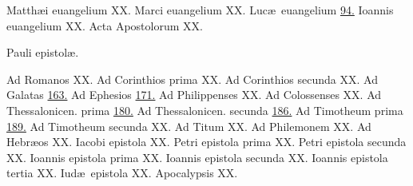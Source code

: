 \documentclass[a5paper,10pt]{book}
\def\ae{æ}
\begin{document}
\begin{multicols}{2}
\par \noindent Matth\ae i euangelium \hfill XX.
\newline Marci euangelium \hfill XX.
\newline Luc\ae \ euangelium \hfill \hyperlink{page.94}{94.}
\newline Ioannis euangelium \hfill XX.
\newline Acta Apostolorum \hfill XX.
\newline \vspace{-1.75em}
\begin{center}
\color{red} Pauli epistol\ae .
\end{center}
\vspace{-.75em}
\par\noindent Ad Romanos \hfill XX.
\newline Ad Corinthios prima \hfill XX.
\newline Ad Corinthios secunda \hfill XX.
\newline Ad Galatas \hfill \hyperlink{page.163}{163.}
\newline Ad Ephesios \hfill \hyperlink{page.171}{171.}
\newline Ad Philippenses \hfill XX.
\newline Ad Colossenses \hfill XX.
\newline Ad Thessalonicen. prima \hfill \hyperlink{page.180}{180.}
\newline Ad Thessalonicen. secunda \hfill \hyperlink{page.186}{186.}
\newline Ad Timotheum prima \hfill \hyperlink{page.189}{189.}
\newline Ad Timotheum secunda \hfill XX.
\newline Ad Titum \hfill XX.
\newline Ad Philemonem \hfill XX.
\newline Ad Hebr\ae os \hfill XX.
\newline Iacobi epistola \hfill XX.
\newline Petri epistola prima \hfill XX.
\newline Petri epistola secunda \hfill XX.
\newline Ioannis epistola prima \hfill XX.
\newline Ioannis epistola secunda \hfill XX.
\newline Ioannis epistola tertia \hfill XX.
\newline Iud\ae \ epistola \hfill XX.
\newline Apocalypsis \hfill XX.
\end{multicols}
\end{document}
